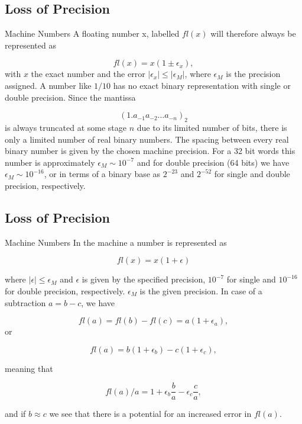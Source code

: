 \documentclass[%
oneside,                 %
final,                   %
10pt]{article}
\begin{document}
\subsection{Loss of Precision}

\begin{block}{Machine Numbers }
A floating number x, labelled $fl(x)$ will therefore always be represented as

\begin{equation}
  fl(x) = x(1\pm \epsilon_x),
\end{equation}
with $x$ the exact number and the error $|\epsilon_x| \le |\epsilon_M|$, where
$\epsilon_M$ is the precision assigned. A number like $1/10$ has no exact binary representation
with single or double precision. Since the mantissa

\[
\left(1.a_{-1}a_{-2}\dots a_{-n}\right)_2
\]
is always truncated at some stage $n$ due to its limited number of bits, there is only a
limited number of real binary numbers. The spacing between every real binary number is given by the
chosen machine precision.
For a 32 bit words this number is approximately
$ \epsilon_M \sim 10^{-7}$ and for double precision (64 bits) we have
$ \epsilon_M \sim 10^{-16}$, or in terms of a binary base
as $2^{-23}$ and $2^{-52}$ for single and double precision, respectively.
\end{block}

\subsection{Loss of Precision}

\begin{block}{Machine Numbers }
In the machine a number is represented as

\begin{equation}
  fl(x)= x(1+\epsilon)
\end{equation}

where $|\epsilon| \leq \epsilon_M$ and $\epsilon$ is given by the
specified precision, $10^{-7}$ for single and $10^{-16}$ for double
precision, respectively.
$\epsilon_M$ is the given precision.
In case of a subtraction $a=b-c$, we have

\begin{equation}
   fl(a)=fl(b)-fl(c) = a(1+\epsilon_a),
\end{equation}
or

\begin{equation}
   fl(a)=b(1+\epsilon_b)-c(1+\epsilon_c),
\end{equation}

meaning that

\begin{equation}
   fl(a)/a=1+\epsilon_b\frac{b}{a}- \epsilon_c\frac{c}{a},
\end{equation}

and if $b\approx c$ we see that there is a potential for an increased
error in $fl(a)$.
\end{block}
\end{document}
